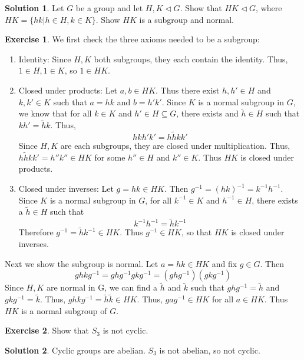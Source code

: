 \documentclass[12pt]{article}
\theoremstyle{definition}
\newtheorem{exercise}{\color{YellowOrange}Exercise}
\theoremstyle{definition}
\newtheorem{solution}{\color{Goldenrod}Solution}
\begin{document}
\begin{solution}
	Let $G$ be a group and let $H,K \triangleleft G$. Show that $HK \triangleleft G$, where $HK = \{hk | h\in H, k \in K\}$. Show $HK$ is a subgroup and normal.
\end{solution}
\begin{exercise}
	We first check the three axioms needed to be a subgroup:
	\begin{enumerate}
		\item Identity: Since $H,K$ both subgroups, they each contain the identity. Thus, $1 \in H, 1\in K$, so $1 \in HK$. 
		\item Closed under products: Let $a, b\in HK$. Thus there exist $h,h' \in H$ and $k,k' \in K$ such that $a=hk$ and $b=h'k'$. Since $K$ is a normal subgroup in $G$, we know that for all $k\in K$ and $h' \in H \subseteq G$, there exists and $\tilde{h} \in H$ such that $kh' = \tilde{h}k$. Thus,
		\begin{equation}
			hkh'k' = h\tilde{h}kk'
		\end{equation}
		Since $H,K$ are each subgroups, they are closed under multiplication. Thus, $h\tilde{h}kk' = h''k'' \in HK$ for some $h'' \in H$ and $k'' \in K$. Thus $HK$ is closed under products. 
		\item Closed under inverses: Let $g = hk \in HK$. Then $g^{-1} = (hk)^{-1} = k^{-1}h^{-1}$. Since $K$ is a normal subgroup in $G$, for all $k^{-1} \in K$ and $h^{-1} \in H$, there exists a $\tilde{h} \in H$ such that 
		\begin{equation}
		 	k^{-1}h^{-1} = \tilde{h}k^{-1}
		 \end{equation} 
		 Therefore $g^{-1} = \tilde{h}k^{-1} \in HK$. Thus $g^{-1} \in HK$, so that $HK$ is closed under inverses. 
	\end{enumerate}
	Next we show the subgroup is normal. Let $a=hk \in HK$ and fix $g \in G$. Then
	\begin{equation}
		ghkg^{-1} = ghg^{-1}gkg^{-1} = (ghg^{-1})(gkg^{-1})
	\end{equation}
	Since $H,K$ are normal in G, we can find a $\tilde{h}$ and $\tilde{k}$ such that $ghg^{-1} = \tilde{h}$ and $gkg^{-1} = \tilde{k}$. Thus, $ghkg^{-1} = \tilde{h}\tilde{k} \in HK$. Thus, $gag^{-1} \in HK$ for all $a \in HK$. Thus $HK$ is a normal subgroup of $G$. 
\end{exercise}

\begin{exercise}
	Show that $S_3$ is not cyclic.
\end{exercise}
\begin{solution}
	Cyclic groups are abelian. $S_3$ is not abelian, so not cyclic.
\end{solution}
\end{document}
